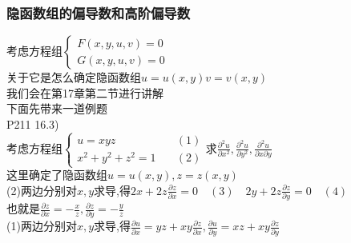 \documentclass[xetex]{beamer}
\begin{document}
\begin{frame}
	\frametitle{隐函数组的偏导数和高阶偏导数}

	考虑方程组$\begin{cases} 
			F(x,y,u,v)=0\\
			G(x,y,u,v)=0
	\end{cases}
	$\\关于它是怎么确定隐函数组$u=u(x,y)$\quad$v=v(x,y)$\\
	我们会在第17章第二节进行讲解\\
	下面先带来一道例题\\
	P211 16.3)\\
	考虑方程组$\begin{cases} 
	u=xyz & \quad(1)\\
	x^2+y^2+z^2=1 & \quad(2)
	\end{cases}$\quad 求$\frac{\partial^2 u}{\partial x^2},\frac{\partial^2 u}{\partial y^2},\frac{\partial^2 u}{\partial x\partial y}$\\
	这里确定了隐函数组$u=u(x,y),z=z(x,y)$\\
	(2)两边分别对$x,y$求导,得$2x+2z\frac{\partial z}{\partial x}=0\quad(3)\quad 2y+2z\frac{\partial z}{\partial y}=0\quad(4)$\\ \pause
	也就是$\frac{\partial z}{\partial x}=-\frac{x}{z},\frac{\partial z}{\partial y}=-\frac{y}{z}$\\ \pause
	(1)两边分别对$x,y$求导,得$\frac{\partial u}{\partial x}=yz+xy\frac{\partial z}{\partial x},\frac{\partial u}{\partial y}=xz+xy\frac{\partial z}{\partial y}$\\ 
	
\end{frame}
\end{document}
